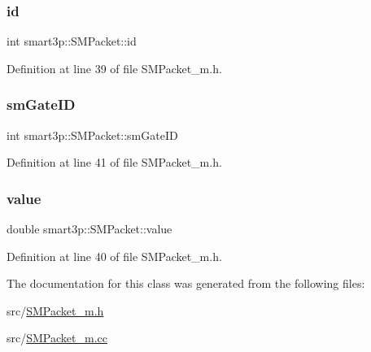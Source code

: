 \subsubsection{\texorpdfstring{id}{id}}
{\footnotesize\ttfamily int smart3p\+::\+S\+M\+Packet\+::id\hspace{0.3cm}{\ttfamily [protected]}}



Definition at line 39 of file S\+M\+Packet\+\_\+m.\+h.

\mbox{\label{classsmart3p_1_1SMPacket_a12d57198d78f1b58b027aba4a99cdc3b}} 
\subsubsection{\texorpdfstring{sm\+Gate\+ID}{smGateID}}
{\footnotesize\ttfamily int smart3p\+::\+S\+M\+Packet\+::sm\+Gate\+ID\hspace{0.3cm}{\ttfamily [protected]}}



Definition at line 41 of file S\+M\+Packet\+\_\+m.\+h.

\mbox{\label{classsmart3p_1_1SMPacket_aa5596bff5a9720c59788a6766357c8d9}} 
\subsubsection{\texorpdfstring{value}{value}}
{\footnotesize\ttfamily double smart3p\+::\+S\+M\+Packet\+::value\hspace{0.3cm}{\ttfamily [protected]}}



Definition at line 40 of file S\+M\+Packet\+\_\+m.\+h.



The documentation for this class was generated from the following files\+:\begin{DoxyCompactItemize}
\item 
src/\hyperlink{SMPacket__m_8h}{S\+M\+Packet\+\_\+m.\+h}\item 
src/\hyperlink{SMPacket__m_8cc}{S\+M\+Packet\+\_\+m.\+cc}\end{DoxyCompactItemize}
